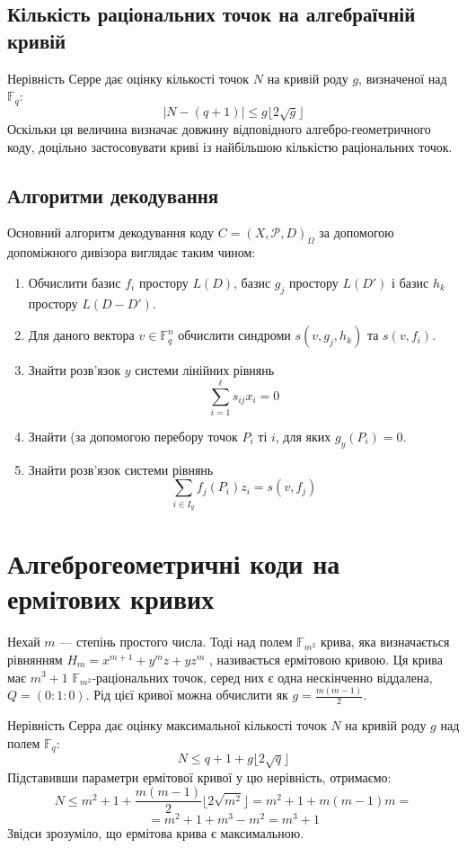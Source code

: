 \documentclass[a4paper,12pt,oneside]{article}
\begin{document}
\subsection{Кількість раціональних точок на алгебраїчній кривій}
Нерівність Серре дає оцінку кількості точок $N$ на кривій роду $g$, визначеної над $\mathbb{F}_q$:
$$|N-(q+1)| \le g \lfloor 2 \sqrt{g} \rfloor$$
Оскільки ця величина визначає довжину відповідного алгебро-геометричного коду, доцільно застосовувати криві із найбільшою кількістю 
раціональних точок.

\subsection{Алгоритми декодування}
Основний алгоритм декодування коду $C = (X, \mathcal{P}, D)_{\Omega}$ за допомогою допоміжного дивізора виглядає таким чином:
\begin{enumerate}
    \item Обчислити базис ${f_i}$ простору $L(D)$, базис ${g_j}$ простору $L(D')$ і базис ${h_k}$ простору $L(D-D')$.
    \item Для даного вектора $v \in \mathbb{F}_q^n$ обчислити синдроми $s(v, g_j, h_k)$ та $s(v, f_i)$.
    \item Знайти розв'язок $y$ системи лінійних рівнянь
        $$\sum_{i=1}^\ell s_{ij} x_i = 0$$
    \item Знайти (за допомогою перебору точок $P_i$ ті $i$, для яких $g_y(P_i) = 0$.
    \item Знайти розв'язок системи рівнянь
        $$\sum_{i \in I_y} f_j(P_i)z_i = s(v, f_j)$$
\end{enumerate}

\pagebreak
\section{Алгеброгеометричні коди на ермітових кривих}
Нехай $m$ --- степінь простого числа. Тоді над полем $\mathbb{F}_{m^2}$ крива, яка визначається рівнянням $H_m = x^{m+1} + y^m z + y z^m$ ,
називається ермітовою кривою. Ця крива має $m^3+1$ $\mathbb{F}_{m^2}$-раціональних точок, серед них є одна нескінченно віддалена, 
$Q = (0:1:0)$. Рід цієї кривої можна обчислити як $g = \frac{m(m-1)}{2}$.

Нерівність Серра дає оцінку максимальної кількості точок $N$ на кривій роду $g$ над полем $\mathbb{F}_q$:
$$ N \le q+1+g \lfloor 2 \sqrt{q} \rfloor $$
Підставивши параметри ермітової кривої у цю нерівність, отримаємо:
$$ N \le m^2 + 1 + \frac{m(m-1)}{2} \lfloor 2 \sqrt{m^2} \rfloor= m^2 + 1 + m(m-1)m = $$
$$ = m^2 + 1 + m^3 - m^2 = m^3 + 1$$
Звідси зрозуміло, що ермітова крива є максимальною.
\end{document}
